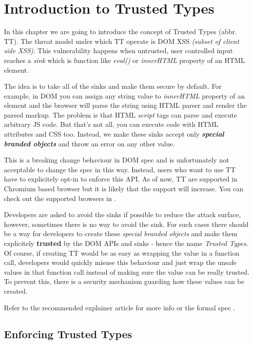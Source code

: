 \chapter{Introduction to Trusted Types}

\label{chapter:intro-tt} %

In this chapter we are going to introduce the concept of Trusted Types (abbr. TT). The threat model
under which TT operate is DOM XSS \emph{(subset of client side XSS)}. This vulnerability happens
when untrusted, user controlled input reaches a \emph{sink} which is function like \emph{eval()} or
\emph{innerHTML} property of an HTML element.

The idea is to take all of the sinks and make them secure by default. For example, in DOM you can
assign any string value to \emph{innerHTML} property of an element and the browser will parse the
string using HTML parser and render the parsed markup. The problem is that HTML \emph{script} tags
can parse and execute arbitrary JS code. But that's not all, you can execute code with HTML
attributes and CSS too. Instead, we make these sinks accept only \emph{\textbf{special branded
    objects}} and throw an error on any other value.

This is a breaking change behaviour in DOM spec and is unfortunately not acceptable to change the
spec in this way. Instead, users who want to use TT have to explicitely opt-in to enforce this API.
As of now, TT are supported in Chromium based browser but it is likely that the support will
increase. You can check out the supported browsers in \cite{tt_compatibility}.

Developers are asked to avoid the sinks if possible to reduce the attack surface, however, sometimes
there is no way to avoid the sink. For such cases there should be a way for developers to create
these \emph{special branded objects} and make them explicitely \textbf{trusted} by the DOM APIs and
sinks - hence the name \emph{Trusted Types}. Of course, if creating TT would be as easy as wrapping
the value in a function call, developers would quickly misuse this behaviour and just wrap the
unsafe values in that function call instead of making sure the value can be really trusted. To
prevent this, there is a security mechanism guarding how these values can be created.

Refer to the recommended explainer article \cite{trusted_types_into} for more info or the formal
spec \cite{tt_spec}.

\section{Enforcing Trusted Types}

